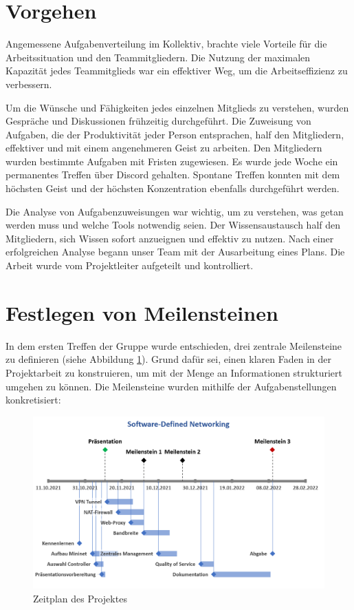 \documentclass[fontsize=12pt,paper=a4,open=any,parskip=half,
  twoside=false,toc=listof,toc=bibliography,fleqn,leqno,
  captions=nooneline,captions=tableabove,british]{scrbook}
\begin{document}
\section{Vorgehen}
Angemessene Aufgabenverteilung im Kollektiv, brachte viele Vorteile für die Arbeitssituation und den Teammitgliedern. Die Nutzung der maximalen Kapazität jedes Teammitglieds war ein effektiver Weg, um die Arbeitseffizienz zu verbessern.\par
Um die Wünsche und Fähigkeiten jedes einzelnen Mitglieds zu verstehen, wurden Gespräche und Diskussionen frühzeitig durchgeführt. Die Zuweisung von Aufgaben, die der Produktivität jeder Person entsprachen, half den Mitgliedern, effektiver und mit einem angenehmeren Geist zu arbeiten. Den Mitgliedern wurden bestimmte Aufgaben mit Fristen zugewiesen. Es wurde jede Woche ein permanentes Treffen über Discord gehalten. Spontane Treffen konnten mit dem höchsten Geist und der höchsten Konzentration ebenfalls durchgeführt werden.\par
Die Analyse von Aufgabenzuweisungen war wichtig, um zu verstehen, was getan werden muss und welche Tools notwendig seien. Der Wissensaustausch half den Mitgliedern, sich Wissen sofort anzueignen und effektiv zu nutzen. Nach einer erfolgreichen Analyse begann unser Team mit der Ausarbeitung eines Plans. Die Arbeit wurde vom Projektleiter aufgeteilt und kontrolliert.

\section{Festlegen von Meilensteinen}
In dem ersten Treffen der Gruppe wurde entschieden, drei zentrale Meilensteine zu definieren (siehe Abbildung \ref{milestones}). Grund dafür sei, einen klaren Faden in der Projektarbeit zu konstruieren, um mit der Menge an Informationen strukturiert umgehen zu können. Die Meilensteine wurden mithilfe der Aufgabenstellungen konkretisiert:

\begin{figure}[H]
 \centering
 \includegraphics[width=1.0\textwidth]{Bilder/meilensteine}
 \captionsetup{justification=centering,margin=2cm}
 \caption{Zeitplan des Projektes}
 \label{milestones}
\end{figure}
\end{document}
